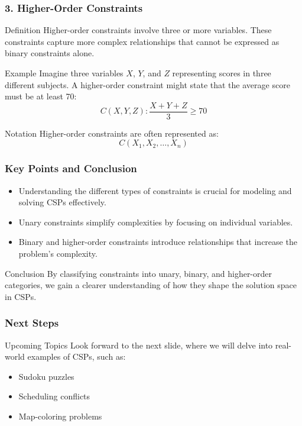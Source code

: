 \documentclass[aspectratio=169]{beamer}
\begin{document}
\begin{frame}[fragile]
    \frametitle{3. Higher-Order Constraints}
    \begin{block}{Definition}
        Higher-order constraints involve three or more variables. These constraints capture more complex relationships that cannot be expressed as binary constraints alone.
    \end{block}

    \begin{block}{Example}
        Imagine three variables \(X\), \(Y\), and \(Z\) representing scores in three different subjects. A higher-order constraint might state that the average score must be at least 70:
        \[
        C(X, Y, Z) : \frac{X + Y + Z}{3} \geq 70
        \]
    \end{block}

    \begin{block}{Notation}
        Higher-order constraints are often represented as:
        \[
        C(X_1, X_2, \ldots, X_n)
        \]
    \end{block}
\end{frame}

\begin{frame}[fragile]
    \frametitle{Key Points and Conclusion}
    \begin{itemize}
        \item Understanding the different types of constraints is crucial for modeling and solving CSPs effectively.
        \item Unary constraints simplify complexities by focusing on individual variables.
        \item Binary and higher-order constraints introduce relationships that increase the problem's complexity.
    \end{itemize}
    
    \begin{block}{Conclusion}
        By classifying constraints into unary, binary, and higher-order categories, we gain a clearer understanding of how they shape the solution space in CSPs.
    \end{block}
\end{frame}

\begin{frame}[fragile]
    \frametitle{Next Steps}
    \begin{block}{Upcoming Topics}
        Look forward to the next slide, where we will delve into real-world examples of CSPs, such as:
        \begin{itemize}
            \item Sudoku puzzles
            \item Scheduling conflicts
            \item Map-coloring problems
        \end{itemize}
    \end{block}
\end{frame}
\end{document}
